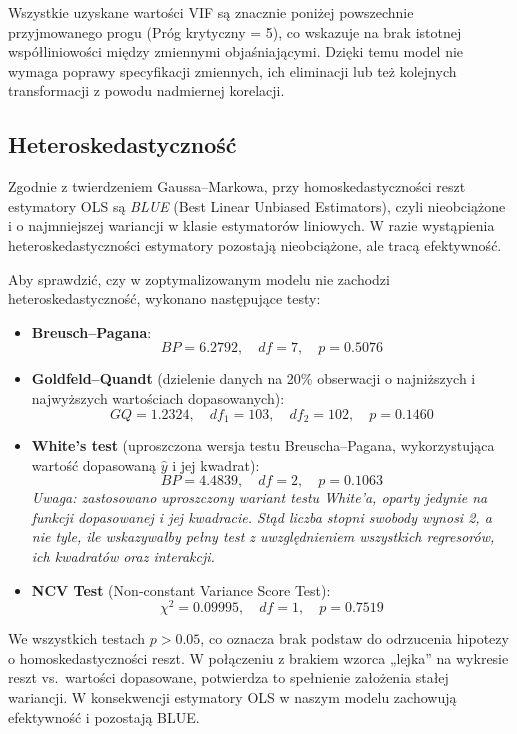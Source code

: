 \documentclass[12pt, twoside]{article}
\begin{document}
Wszystkie uzyskane wartości VIF są znacznie poniżej powszechnie przyjmowanego progu (Próg krytyczny = 5), co wskazuje na brak istotnej współliniowości między zmiennymi objaśniającymi. Dzięki temu model nie wymaga poprawy specyfikacji zmiennych, ich eliminacji lub też kolejnych transformacji z powodu nadmiernej korelacji.

\subsection*{Heteroskedastyczność}
\label{sec:efektywnosc_hetero}

Zgodnie z twierdzeniem Gaussa–Markowa, przy homoskedastyczności reszt estymatory OLS są \emph{BLUE} (Best Linear Unbiased Estimators), czyli nieobciążone i o najmniejszej wariancji w klasie estymatorów liniowych. W razie wystąpienia heteroskedastyczności estymatory pozostają nieobciążone, ale tracą efektywność.

Aby sprawdzić, czy w zoptymalizowanym modelu nie zachodzi heteroskedastyczność, wykonano następujące testy:

\begin{itemize}
  \item \textbf{Breusch–Pagana}:
    \[
      BP = 6.2792,\quad df = 7,\quad p = 0.5076
    \]
  \item \textbf{Goldfeld–Quandt} (dzielenie danych na 20\% obserwacji o najniższych i najwyższych wartościach dopasowanych):
    \[
      GQ = 1.2324,\quad df_1 = 103,\quad df_2 = 102,\quad p = 0.1460
    \]
\item \textbf{White’s test} (uproszczona wersja testu Breuscha–Pagana, wykorzystująca wartość dopasowaną \(\hat{y}\) i jej kwadrat):
\[
  BP = 4.4839,\quad df = 2,\quad p = 0.1063
\]
\textit{Uwaga: zastosowano uproszczony wariant testu White’a, oparty jedynie na funkcji dopasowanej i jej kwadracie. Stąd liczba stopni swobody wynosi 2, a nie tyle, ile wskazywałby pełny test z uwzględnieniem wszystkich regresorów, ich kwadratów oraz interakcji.}

  \item \textbf{NCV Test} (Non‐constant Variance Score Test):
    \[
      \chi^2 = 0.09995,\quad df = 1,\quad p = 0.7519
    \]
\end{itemize}

\noindent
We wszystkich testach \(p>0.05\), co oznacza brak podstaw do odrzucenia hipotezy o homoskedastyczności reszt. W połączeniu z brakiem wzorca „lejka” na wykresie reszt vs.\ wartości dopasowane, potwierdza to spełnienie założenia stałej wariancji. W konsekwencji estymatory OLS w naszym modelu zachowują efektywność i pozostają BLUE.
\end{document}
